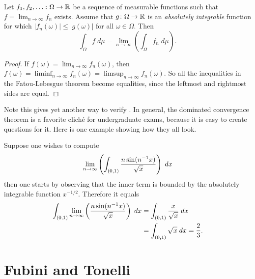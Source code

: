 \begin{corollary}
	Let $f_1, f_2, \dots \colon \Omega \to \mathbb R$
	be a sequence of measurable functions
	such that $f = \lim_{n \to \infty} f_n$ exists.
	Assume that $g \colon \Omega \to \mathbb R$ is an
	\emph{absolutely integrable} function for which
	$|f_n(\omega)| \le |g(\omega)|$ for all $\omega \in \Omega$.
	Then
	\[ \int_\Omega f \; d \mu
		= \lim_{n \to \infty} \left( \int_\Omega f_n \; d\mu \right). \]
\end{corollary}
\begin{proof}
	If $f(\omega) = \lim_{n \to \infty} f_n(\omega)$,
	then $f(\omega) = \liminf_{n \to \infty} f_n(\omega)
	= \limsup_{n \to \infty} f_n(\omega)$.
	So all the inequalities in the Fatou-Lebesgue theorem
	become equalities, since the leftmost and rightmost sides are equal.
\end{proof}
Note this gives yet another way to verify .
In general, the dominated convergence theorem
is a favorite clich\'{e} for undergraduate exams,
because it is easy to create questions for it.
Here is one example showing how they all look.
\begin{example}
	Suppose one wishes to compute
	\[ \lim_{n \to \infty}
		\left( \int_{(0,1)} \frac{n\sin(n^{-1} x)}{\sqrt x} \right) \; dx \]
	then one starts by observing that
	the inner term is bounded by the absolutely integrable function $x^{-1/2}$.
	Therefore it equals
	\begin{align*}
		\int_{(0,1)} \lim_{n \to \infty}
			\left( \frac{n\sin(n^{-1} x)}{\sqrt x} \right) \; dx
		&= \int_{(0,1)} \frac{x}{\sqrt x} \; dx \\
		&= \int_{(0,1)} \sqrt{x} \; dx = \frac23.
	\end{align*}
\end{example}

\section{Fubini and Tonelli}

\section{\problemhead}
